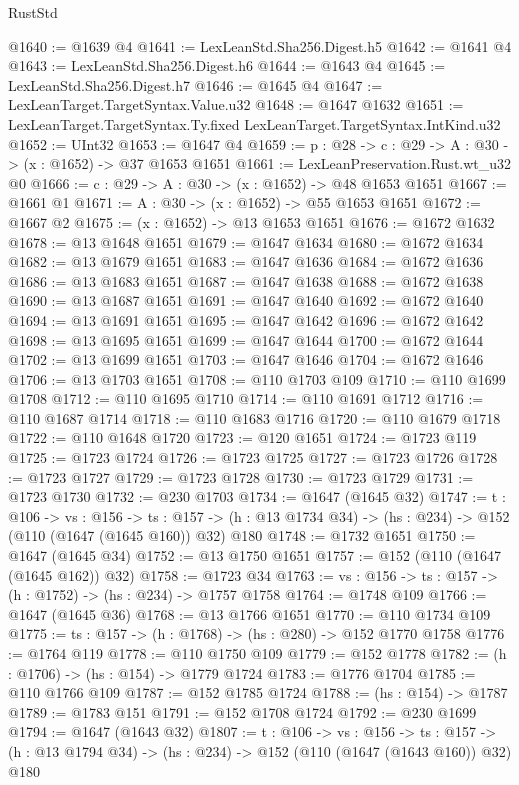 \begin{lexlean}{RustStd}
\begin{coremodule}
@1640 := @1639 @4
@1641 := LexLeanStd.Sha256.Digest.h5
@1642 := @1641 @4
@1643 := LexLeanStd.Sha256.Digest.h6
@1644 := @1643 @4
@1645 := LexLeanStd.Sha256.Digest.h7
@1646 := @1645 @4
@1647 := LexLeanTarget.TargetSyntax.Value.u32
@1648 := @1647 @1632
@1651 := LexLeanTarget.TargetSyntax.Ty.fixed LexLeanTarget.TargetSyntax.IntKind.u32
@1652 := UInt32
@1653 := @1647 @4
@1659 := {p : @28} -> {c : @29} -> {A : @30} -> (x : @1652) -> @37 @1653 @1651
@1661 := LexLeanPreservation.Rust.wt_u32 @0
@1666 := {c : @29} -> {A : @30} -> (x : @1652) -> @48 @1653 @1651
@1667 := @1661 @1
@1671 := {A : @30} -> (x : @1652) -> @55 @1653 @1651
@1672 := @1667 @2
@1675 := (x : @1652) -> @13 @1653 @1651
@1676 := @1672 @1632
@1678 := @13 @1648 @1651
@1679 := @1647 @1634
@1680 := @1672 @1634
@1682 := @13 @1679 @1651
@1683 := @1647 @1636
@1684 := @1672 @1636
@1686 := @13 @1683 @1651
@1687 := @1647 @1638
@1688 := @1672 @1638
@1690 := @13 @1687 @1651
@1691 := @1647 @1640
@1692 := @1672 @1640
@1694 := @13 @1691 @1651
@1695 := @1647 @1642
@1696 := @1672 @1642
@1698 := @13 @1695 @1651
@1699 := @1647 @1644
@1700 := @1672 @1644
@1702 := @13 @1699 @1651
@1703 := @1647 @1646
@1704 := @1672 @1646
@1706 := @13 @1703 @1651
@1708 := @110 @1703 @109
@1710 := @110 @1699 @1708
@1712 := @110 @1695 @1710
@1714 := @110 @1691 @1712
@1716 := @110 @1687 @1714
@1718 := @110 @1683 @1716
@1720 := @110 @1679 @1718
@1722 := @110 @1648 @1720
@1723 := @120 @1651
@1724 := @1723 @119
@1725 := @1723 @1724
@1726 := @1723 @1725
@1727 := @1723 @1726
@1728 := @1723 @1727
@1729 := @1723 @1728
@1730 := @1723 @1729
@1731 := @1723 @1730
@1732 := @230 @1703
@1734 := @1647 (@1645 @32)
@1747 := {t : @106} ->
  {vs : @156} ->
  {ts : @157} -> (h : @13 @1734 @34) -> (hs : @234) -> @152 (@110 (@1647 (@1645 @160)) @32) @180
@1748 := @1732 @1651
@1750 := @1647 (@1645 @34)
@1752 := @13 @1750 @1651
@1757 := @152 (@110 (@1647 (@1645 @162)) @32)
@1758 := @1723 @34
@1763 := {vs : @156} -> {ts : @157} -> (h : @1752) -> (hs : @234) -> @1757 @1758
@1764 := @1748 @109
@1766 := @1647 (@1645 @36)
@1768 := @13 @1766 @1651
@1770 := @110 @1734 @109
@1775 := {ts : @157} -> (h : @1768) -> (hs : @280) -> @152 @1770 @1758
@1776 := @1764 @119
@1778 := @110 @1750 @109
@1779 := @152 @1778
@1782 := (h : @1706) -> (hs : @154) -> @1779 @1724
@1783 := @1776 @1704
@1785 := @110 @1766 @109
@1787 := @152 @1785 @1724
@1788 := (hs : @154) -> @1787
@1789 := @1783 @151
@1791 := @152 @1708 @1724
@1792 := @230 @1699
@1794 := @1647 (@1643 @32)
@1807 := {t : @106} ->
  {vs : @156} ->
  {ts : @157} -> (h : @13 @1794 @34) -> (hs : @234) -> @152 (@110 (@1647 (@1643 @160)) @32) @180

\end{coremodule}
\end{lexlean}
